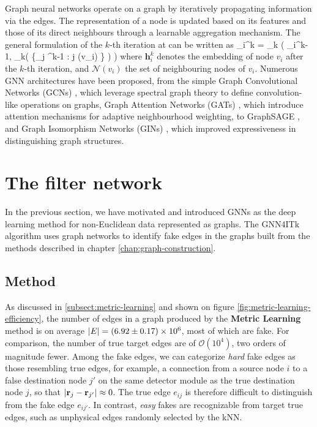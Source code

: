 Graph neural networks operate on a graph by iteratively propagating information via the edges.
The representation of a node is updated based on its features and those of its direct neighbours through a learnable aggregation mechanism.
The general formulation of the $k$-th iteration at can be written as 
\beq
\label{eq:gnn:1}
_i^k = _k \left( _i^{k-1}, _k\left( \{_j ^{k-1} : j\in {} (v_i) \} \right) \right)
\eeq
where $\mathbf{h}_i^k$ denotes the embedding of node $v_i$ after the $k$-th iteration, and $\mathcal{N} (v_i)$ the set of neighbouring nodes of $v_i$. 
Numerous GNN architectures have been proposed, from the simple Graph Convolutional Networks (GCNs) \cite{gcn}, 
which leverage spectral graph theory to define convolution-like operations on graphs, 
Graph Attention Networks (GATs) \cite{gat}, which introduce attention mechanisms for adaptive neighbourhood weighting, 
to GraphSAGE \cite{graphsage}, and Graph Isomorphism Networks (GINs) \cite{gin}, which improved expressiveness in distinguishing graph structures.

\section{The filter network}
\label{sect:chap-gnn-filter-network}

In the previous section, we have motivated and introduced GNNs as the deep learning method for non-Euclidean data represented as graphs. 
The GNN4ITk algorithm uses graph networks to identify fake edges in the graphs built from the methods described in chapter \ref{chap:graph-construction}. 

\subsection{Method}

As discussed in \ref{subsect:metric-learning} and shown on figure \ref{fig:metric-learning-efficiency}, the number of edges in a graph produced by the \textbf{Metric Learning} method is on average $\abs{E} = (6.92\pm0.17)\times 10^6$, most of which are fake. 
For comparison, the number of true target edges are of $\mathcal{O}(10^4)$, two orders of magnitude fewer. 
Among the fake edges, we can categorize \textit{hard} fake edges as those resembling true edges, for example, a connection from a source node $i$ to a false destination node $j'$ on the same detector module as the true destination node $j$, so that $\abs{\mathbf{r}_j - \mathbf{r}_{j'}} \approx 0$. 
The true edge $e_{ij}$ is therefore difficult to distinguish from the fake edge $e_{ij'}$.
In contrast, \textit{easy} fakes are recognizable from target true edges, such as unphysical edges randomly selected by the kNN. 

